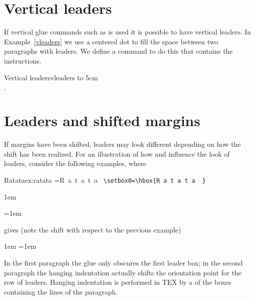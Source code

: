 \section{Vertical leaders}

If vertical glue commands such as  is used it is possible to have
vertical leaders. In Example~\ref{vleaders} we use a centered dot  to fill the space between two paragraphs with leaders. We define a command
 to do this that contains the instructions.

\begin{texexample}{Vertical leaders}{vleaders}
\newcommand{\vdotfill}{%
  \par\leaders\hbox{$\cdot$}\vfill}
  \vbox to 5cm {%
  \lorem
  \vdotfill
  \lorem
  }
\end{texexample}





\section{Leaders and shifted margins}

If margins have been shifted, leaders may look different depending on how the shift has been realized.
For an illustration of how and influence the look of leaders, consider
the following examples, where

\begin{texexample}{Ratata}{ex:ratata}
=\hbox{R a t a t a  }
\verb+\setbox0=\hbox{R a t a t a  }+



\hbox{\kern1em\hbox{\leaders{}\hskip5cm}}

\hangindent=1em  \noindent
\leaders{}\hskip5cm\hbox{}\par
\end{texexample}

gives (note the shift with respect to the previous example)
\medskip

{\hbox{\kern1em\hbox{\leaders{}\hskip5cm}}
\hangindent=1em  \noindent
\leaders{}\hskip5cm\hbox{}\par}

In the first paragraph the glue only obscures the first leader box; in the second paragraph
the hanging indentation actually shifts the orientation point for the row of leaders. Hanging
indentation is performed in TEX by a of the boxes containing the lines of the
paragraph.

